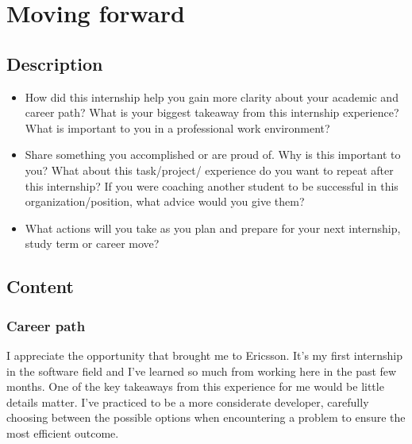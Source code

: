 \newpage
\section{Moving forward}

\subsection{Description}

\begin{itemize}
    \item How did this internship help you gain more clarity about your academic and career path? What is your biggest takeaway from this internship experience? What is important to you in a professional work environment?
    \item Share something you accomplished or are proud of. Why is this important to you? What about this task/project/ experience do you want to repeat after this internship? If you were coaching another student to be successful in this organization/position, what advice would you give them?
    \item What actions will you take as you plan and prepare for your next internship, study term or career move? 
\end{itemize}


\subsection{Content}

\subsubsection{Career path}
I appreciate the opportunity that brought me to Ericsson. 
It's my first internship in the software field and I've learned so much from working here in the past few months.
One of the key takeaways from this experience for me would be little details matter.
I've practiced to be a more considerate developer, carefully choosing between the possible options when encountering a problem to ensure the most efficient outcome.

